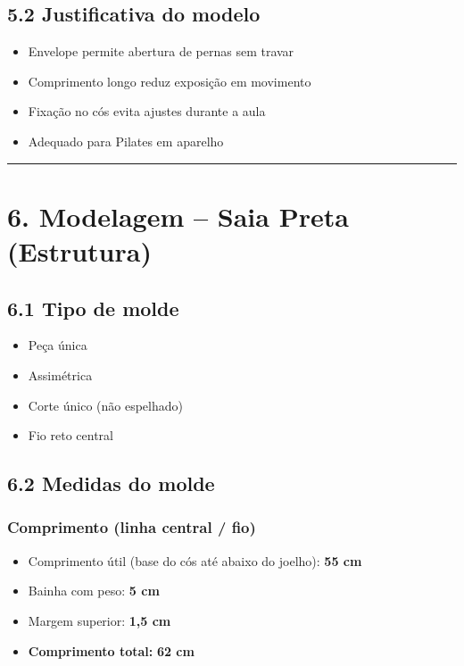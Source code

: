 \documentclass[
  10pt,oneside]{article}
\providecommand{\tightlist}{%
  \setlength{\itemsep}{0pt}\setlength{\parskip}{0pt}}
\begin{document}
\subsection{5.2 Justificativa do modelo}\label{justificativa-do-modelo}

\begin{itemize}
\tightlist
\item
  Envelope permite abertura de pernas sem travar
\item
  Comprimento longo reduz exposição em movimento
\item
  Fixação no cós evita ajustes durante a aula
\item
  Adequado para Pilates em aparelho
\end{itemize}

\begin{center}\rule{0.5\linewidth}{0.5pt}\end{center}

\section{6. Modelagem -- Saia Preta (Estrutura)}\label{modelagem-saia-preta-estrutura}

\subsection{6.1 Tipo de molde}\label{tipo-de-molde}

\begin{itemize}
\tightlist
\item
  Peça única
\item
  Assimétrica
\item
  Corte único (não espelhado)
\item
  Fio reto central
\end{itemize}

\subsection{6.2 Medidas do molde}\label{medidas-do-molde}

\subsubsection{Comprimento (linha central / fio)}\label{comprimento-linha-central-fio}

\begin{itemize}
\tightlist
\item
  Comprimento útil (base do cós até abaixo do joelho): \textbf{55 cm}
\item
  Bainha com peso: \textbf{5 cm}
\item
  Margem superior: \textbf{1,5 cm}
\item
  \textbf{Comprimento total:} \textbf{62 cm}
\end{itemize}
\end{document}
